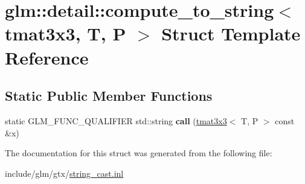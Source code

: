 \hypertarget{structglm_1_1detail_1_1compute__to__string_3_01tmat3x3_00_01T_00_01P_01_4}{}\section{glm\+:\+:detail\+:\+:compute\+\_\+to\+\_\+string$<$ tmat3x3, T, P $>$ Struct Template Reference}
\label{structglm_1_1detail_1_1compute__to__string_3_01tmat3x3_00_01T_00_01P_01_4}
\subsection*{Static Public Member Functions}
\begin{DoxyCompactItemize}
\item 
\mbox{\label{structglm_1_1detail_1_1compute__to__string_3_01tmat3x3_00_01T_00_01P_01_4_a30955bc053389846e9f0a7a7154babb7}} 
static G\+L\+M\+\_\+\+F\+U\+N\+C\+\_\+\+Q\+U\+A\+L\+I\+F\+I\+ER std\+::string {\bfseries call} (\hyperlink{structglm_1_1tmat3x3}{tmat3x3}$<$ T, P $>$ const \&x)
\end{DoxyCompactItemize}


The documentation for this struct was generated from the following file\+:\begin{DoxyCompactItemize}
\item 
include/glm/gtx/\hyperlink{string__cast_8inl}{string\+\_\+cast.\+inl}\end{DoxyCompactItemize}
